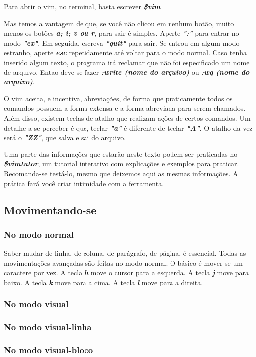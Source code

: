 \documentclass[a4paper, 12pt]{article}
\begin{document}
Para abrir o vim, no terminal, basta escrever \textbf{\textit{\$vim}}


Mas temos a vantagem de que, se você não clicou em nenhum botão, muito menos os botões \textbf{\textit{a; i; v ou r}}, para sair é simples.
Aperte \textbf{\textit{":"}} para entrar no modo \textbf{\textit{"ex"}}. Em seguida, escreva \textbf{\textit{"quit"}} para sair.
Se entrou em algum modo estranho, aperte \textbf{\textit{esc}} repetidamente até voltar para o modo normal.
Caso tenha inserido algum texto, o programa irá reclamar que não foi especificado um nome de arquivo.
Então deve-se fazer \textbf{\textit{:write (nome do arquivo)}} ou \textbf{\textit{:wq (nome do arquivo)}}.

O vim aceita, e incentiva, abreviações, de forma que praticamente todos os comandos possuem a forma extensa e a forma abreviada para serem chamados.
Além disso, existem teclas de atalho que realizam ações de certos comandos.
Um detalhe a se perceber é que, teclar \textbf{\textit{"a"}} é diferente de teclar \textbf{\textit{"A"}}.
O atalho da vez será o \textbf{\textit{"ZZ"}}, que salva e sai do arquivo.

Uma parte das informações que estarão neste texto podem ser praticadas no \textbf{\textit{\$vimtutor}}, um tutorial interativo com explicações e exemplos para praticar.
Recomanda-se testá-lo, mesmo que deixemos aqui as mesmas informações. A prática fará você criar intimidade com a ferramenta.

\subsection{Movimentando-se}
\subsubsection{No modo normal}
Saber mudar de linha, de coluna, de parágrafo, de página, é essencial.
Todas as movimentações avançadas são feitas no modo normal.
O básico é mover-se um caractere por vez.
A tecla \textbf{\textit{h}} move o cursor para a esquerda.
A tecla \textbf{\textit{j}} move para baixo.
A tecla \textbf{\textit{k}} move para a cima.
A tecla \textbf{\textit{l}} move para a direita.
\subsubsection{No modo visual}
\subsubsection{No modo visual-linha}
\subsubsection{No modo visual-bloco}
\end{document}
